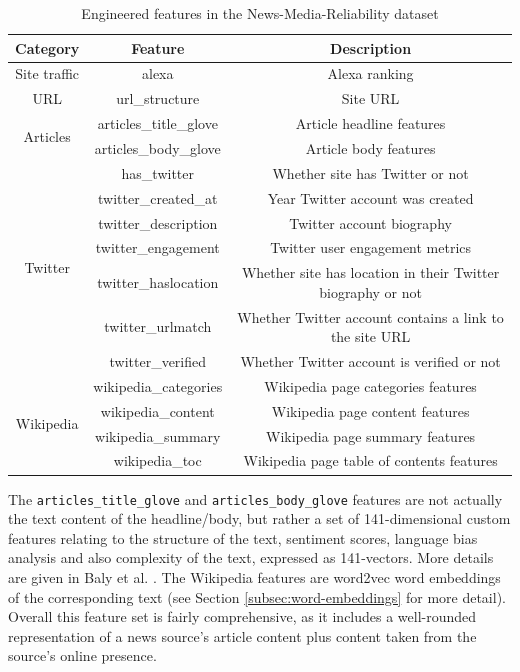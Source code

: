\begin{table}[h!]
    \centering
    \begin{tabular}{|c|c|c|}
        \hline
        \textbf{Category} & \textbf{Feature} & \textbf{Description} \\
        \hline
        Site traffic & alexa & Alexa ranking \\
        \hline
        URL & url\_structure & Site URL \\
        \hline
        \multirow{2}{4em}{Articles} & articles\_title\_glove & Article headline features \\
        & articles\_body\_glove & Article body features \\
        \hline
        \multirow{7}{4em}{Twitter} & has\_twitter & Whether site has Twitter or not \\
        & twitter\_created\_at & Year Twitter account was created \\
        & twitter\_description & Twitter account biography \\
        & twitter\_engagement & Twitter user engagement metrics \\
        & twitter\_haslocation & Whether site has location in their Twitter biography or not \\
        & twitter\_urlmatch & Whether Twitter account contains a link to the site URL \\
        & twitter\_verified & Whether Twitter account is verified or not \\
        \hline
        \multirow{4}{4em}{Wikipedia} & wikipedia\_categories & Wikipedia page categories features \\
        & wikipedia\_content & Wikipedia page content features \\
        & wikipedia\_summary & Wikipedia page summary features \\
        & wikipedia\_toc &  Wikipedia page table of contents features \\
        \hline
    \end{tabular}
    \caption{Engineered features in the News-Media-Reliability dataset}
    \label{tab:nmr-features}
\end{table}

The \texttt{articles\_title\_glove} and \texttt{articles\_body\_glove} features are not actually the text content of the headline/body, but rather a set of 141-dimensional custom features relating to the structure of the text, sentiment scores, language bias analysis and also complexity of the text, expressed as 141-vectors. More details are given in Baly et al. \cite{baly-emnlp18}. The Wikipedia features are word2vec word embeddings of the corresponding text (see Section \ref{subsec:word-embeddings} for more detail). Overall this feature set is fairly comprehensive, as it includes a well-rounded representation of a news source's article content plus content taken from the source's online presence.

